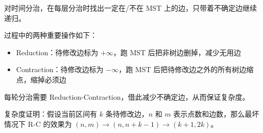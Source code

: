 
对时间分治，在每层分治时找出一定在/不在 MST 上的边，只带着不确定边继续递归。

过程中的两种重要操作如下：

\begin{itemize}
	\item Reduction：待修改边标为 $+\infty$，跑 MST 后把非树边删掉，减少无用边
	\item Contraction：待修改边标为 $-\infty$，跑 MST 后把待修改边之外的所有树边缩点，缩掉必须边
\end{itemize}

每轮分治需要 Reduction-Contraction，借此减少不确定边，从而保证复杂度。

复杂度证明：假设当前区间有 $k$ 条待修改边，$n$ 和 $m$ 表示点数和边数，那么最坏情况下 R-C 的效果为 $(n, m) \to (n, n + k - 1) \to (k + 1, 2k)$。

\inputminted{cpp}{../src/graph/动态最小生成树.cpp}
